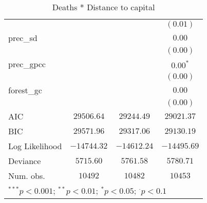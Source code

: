 \begin{sidewaystable}
\begin{center}
{\begin{tabular}{l c c c}
                     &               &               & $(0.01)$      \\
prec\_sd             &               &               & $0.00$        \\
                     &               &               & $(0.00)$      \\
prec\_gpcc           &               &               & $0.00^{*}$    \\
                     &               &               & $(0.00)$      \\
forest\_gc           &               &               & $0.00$        \\
                     &               &               & $(0.00)$      \\
\hline
AIC                  & $29506.64$    & $29244.49$    & $29021.37$    \\
BIC                  & $29571.96$    & $29317.06$    & $29130.19$    \\
Log Likelihood       & $-14744.32$   & $-14612.24$   & $-14495.69$   \\
Deviance             & $5715.60$     & $5761.58$     & $5780.71$     \\
Num. obs.            & $10492$       & $10482$       & $10453$       \\
\hline
\multicolumn{4}{l}{\scriptsize{$^{***}p<0.001$; $^{**}p<0.01$; $^{*}p<0.05$; $^{\cdot}p<0.1$}}
\end{tabular}
}
\caption{Deaths * Distance to capital}
\label{interaction_sqrtDeaths}
\end{center}
\end{sidewaystable}
